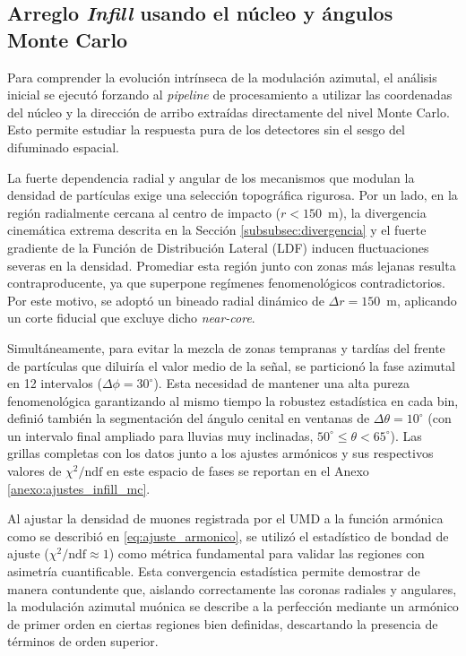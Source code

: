 \subsection{Arreglo \textit{Infill} usando el núcleo y ángulos Monte Carlo}
\label{subsec:infill_mc}

Para comprender la evolución intrínseca de la modulación azimutal, el análisis inicial se ejecutó forzando al \textit{pipeline} de procesamiento a utilizar las coordenadas del núcleo y la dirección de arribo extraídas directamente del nivel Monte Carlo. Esto permite estudiar la respuesta pura de los detectores sin el sesgo del difuminado espacial.

La fuerte dependencia radial y angular de los mecanismos que modulan la densidad de partículas exige una selección topográfica rigurosa. Por un lado, en la región radialmente cercana al centro de impacto ($r < 150$~m), la divergencia cinemática extrema descrita en la Sección \ref{subsubsec:divergencia} y el fuerte gradiente de la Función de Distribución Lateral (LDF) inducen fluctuaciones severas en la densidad. Promediar esta región junto con zonas más lejanas resulta contraproducente, ya que superpone regímenes fenomenológicos contradictorios. Por este motivo, se adoptó un bineado radial dinámico de $\Delta r = 150$~m, aplicando un corte fiducial que excluye dicho \textit{near-core}. 

Simultáneamente, para evitar la mezcla de zonas tempranas y tardías del frente de partículas que diluiría el valor medio de la señal, se particionó la fase azimutal en 12 intervalos ($\Delta\phi = 30^\circ$). Esta necesidad de mantener una alta pureza fenomenológica garantizando al mismo tiempo la robustez estadística en cada bin, definió también la segmentación del ángulo cenital en ventanas de $\Delta \theta = 10^\circ$ (con un intervalo final ampliado para lluvias muy inclinadas, $50^\circ \leq \theta < 65^\circ$). Las grillas completas con los datos junto a los ajustes armónicos y sus respectivos valores de $\chi^2/\text{ndf}$ en este espacio de fases se reportan en el Anexo \ref{anexo:ajustes_infill_mc}.

Al ajustar la densidad de muones registrada por el UMD a la función armónica como se describió en \ref{eq:ajuste_armonico}, se utilizó el estadístico de bondad de ajuste ($\chi^2/\text{ndf} \approx 1$) como métrica fundamental para validar las regiones con asimetría cuantificable. Esta convergencia estadística permite demostrar de manera contundente que, aislando correctamente las coronas radiales y angulares, la modulación azimutal muónica se describe a la perfección mediante un armónico de primer orden en ciertas regiones bien definidas, descartando la presencia de términos de orden superior.


